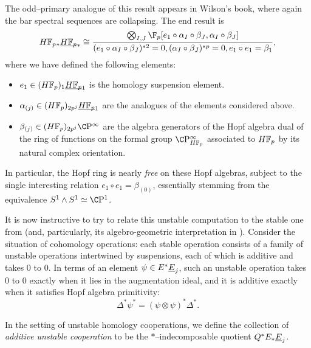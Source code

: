 \begin{remark}
The odd--primary analogue of this result appears in Wilson's book, where again the bar spectral sequences are collapsing.  The end result is \[\HFp_* \OS{\HFp}{*} \cong \frac{\bigotimes_{I, J} \F_p[e_1 \circ \alpha_I \circ \beta_J, \alpha_I \circ \beta_J]}{(e_1 \circ \alpha_I \circ \beta_J)^{\ast 2} = 0, (\alpha_I \circ \beta_J)^{\ast p} = 0, e_1 \circ e_1 = \beta_1},\] where we have defined the following elements:
\begin{itemize}
\item \(e_1 \in (\HFp)_1 \OS{\HFp}{1}\) is the homology suspension element.
\item \(\alpha_{(j)} \in (\HFp)_{2p^j} \OS{\HFp}{1}\) are the analogues of the elements considered above.
\item \(\beta_{(j)} \in (\HFp)_{2p^j} \CP^\infty\) are the algebra generators of the Hopf algebra dual of the ring of functions on the formal group \(\CP^\infty_{\HFp}\) associated to \(\HFp\) by its natural complex orientation.
\end{itemize}
In particular, the Hopf ring is nearly \emph{free} on these Hopf algebras, subject to the single interesting relation \(e_1 \circ e_1 = \beta_{(0)}\), essentially stemming from the equivalence \(S^1 \sm S^1 \simeq \CP^1\).
\end{remark}

It is now instructive to try to relate this unstable computation to the stable one from  (and, particularly, its algebro-geometric interpretation in ).  Consider the situation of cohomology operations: each stable operation consists of a family of unstable operations intertwined by suspensions, each of which is additive and takes \(0\) to \(0\).  In terms of an element \(\psi \in E^* \underline{\smash{E}}_{j}\), such an unstable operation takes \(0\) to \(0\) exactly when it lies in the augmentation ideal, and it is additive exactly when it satisfies Hopf algebra primitivity: \[\Delta^* \psi^* = (\psi \otimes \psi)^* \Delta^*.\]
\begin{definition}
In the setting of unstable homology cooperations, we define the collection of \textit{additive unstable cooperation} to be the \(\ast\)--indecomposable quotient \(Q^* E_* \underline{\smash{E}}_{j}\).
\end{definition}

